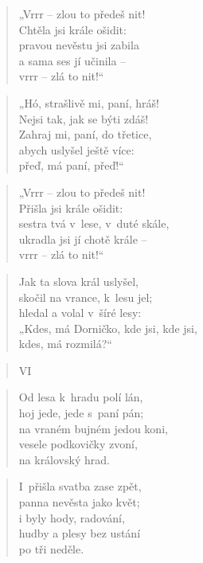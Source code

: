 \begin{verse}
„Vrrr -- zlou to předeš nit! \\
Chtěla jsi krále ošidit: \\
pravou nevěstu jsi zabila \\
a sama ses jí učinila -- \\
vrrr -- zlá to nit!“
\end{verse}

\begin{verse}
„Hó, strašlivě mi, paní, hráš! \\
Nejsi tak, jak se býti zdáš! \\
Zahraj mi, paní, do třetice, \\
abych uslyšel ještě více: \\
přeď, má paní, přeď!“
\end{verse}

\begin{verse}
„Vrrr -- zlou to předeš nit! \\
Přišla jsi krále ošidit: \\
sestra tvá v~lese, v~duté skále, \\
ukradla jsi jí chotě krále -- \\
vrrr -- zlá to nit!“
\end{verse}

\begin{verse}
Jak ta slova král uslyšel, \\
skočil na vrance, k~lesu jel; \\
hledal a volal v~šíré lesy: \\
„Kdes, má Dorničko, kde jsi, kde jsi, \\
kdes, má rozmilá?“
\end{verse}

\begin{verse}
VI
\end{verse}

\begin{verse}
Od lesa k~hradu polí lán, \\
hoj jede, jede s~paní pán; \\
na vraném bujném jedou koni, \\
vesele podkovičky zvoní, \\
na královský hrad.
\end{verse}

\begin{verse}
I~přišla svatba zase zpět, \\
panna nevěsta jako květ; \\
i byly hody, radování, \\
hudby a plesy bez ustání \\
po tři neděle.
\end{verse}

